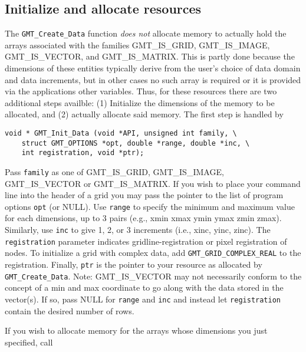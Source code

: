 \documentclass[11pt]{report}
\begin{document}

\subsection{Initialize and allocate resources}

The \texttt{GMT\_Create\_Data} function \emph{does not} allocate memory to actually hold
the arrays associated with the families GMT\_IS\_GRID, GMT\_IS\_IMAGE, GMT\_IS\_VECTOR,
and GMT\_IS\_MATRIX.  This is partly done because the dimensions of these entities typically
derive from the user's choice of data domain and data increments, but in other cases no such
array is required or it is provided via the applications other variables.  Thus, for these
resources there are two additional steps availble: (1) Initialize the dimensions of the memory
to be allocated, and (2) actually allocate said memory.  The first step is handled by 


\begin{verbatim}
void * GMT_Init_Data (void *API, unsigned int family, \
    struct GMT_OPTIONS *opt, double *range, double *inc, \
    int registration, void *ptr);
\end{verbatim}
Pass \texttt{family} as one of GMT\_IS\_GRID, GMT\_IS\_IMAGE, GMT\_IS\_VECTOR or GMT\_IS\_MATRIX.
If you wish to place your command line into the header of a grid you may pass the pointer to the list
of program options \texttt{opt} (or NULL).  Use \texttt{range} to specify the minimum and maximum
value for each dimensions, up to 3 pairs (e.g., xmin xmax ymin ymax zmin zmax). Similarly, use
\texttt{inc} to give 1, 2, or 3 increments (i.e., xinc, yinc, zinc).  The
\texttt{registration} parameter indicates gridline-registration or pixel registration of nodes.
To initialize a grid with complex data, add \texttt{GMT\_GRID\_COMPLEX\_REAL} to the registration.
Finally, \texttt{ptr} is the pointer to your resource as allocated by \texttt{GMT\_Create\_Data}.
Note: GMT\_IS\_VECTOR may not necessarily conform to the concept of a min and max coordinate to go
along with the data stored in the vector(s).  If so, pass NULL for \texttt{range} and \texttt{inc}
and instead let \texttt{registration} contain the desired number of rows.

If you wish to allocate memory for the arrays whose dimensions you just specified, call
\end{document}
